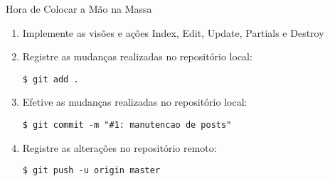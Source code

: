 \begin{frame}{Hora de Colocar a Mão na Massa}
	\begin{enumerate}
		\item Implemente as visões e ações Index, Edit, Update, Partials e Destroy
		
		\item Registre as mudanças realizadas no repositório local:
		\begin{lstlisting}[style=BashInputBasicStyle]
			$ git add .
		\end{lstlisting}

        \item Efetive as mudanças realizadas no repositório local:  		
        \begin{lstlisting}[style=BashInputBasicStyle]
			$ git commit -m "#1: manutencao de posts"
		\end{lstlisting}

		\item Registre as alterações no repositório remoto:
		\begin{lstlisting}[style=BashInputBasicStyle]
			$ git push -u origin master
		\end{lstlisting}
	\end{enumerate}
\end{frame}